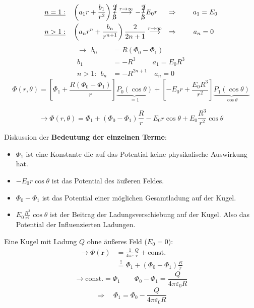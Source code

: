 \documentclass[titlepage,11pt,a4paper,ngerman]{report}
\newcommand{\tx}[1]{\textrm{#1}}
\newcommand{\const}{\tx{const.}}
\newcommand{\ub}[1]{\underbrace{#1}}
\newcommand{\pofr}{\Phi(\vec{r})}
\renewcommand{\Phi}{\varPhi}
\renewcommand{\vec}[1]{\boldsymbol{#1}}
\renewcommand{\epsilon}{\varepsilon}
\newcommand{\frbox}[2]{\begin{tcolorbox}[colback=white,colframe=red!75!black,fonttitle=\bfseries,title=#1]#2\end{tcolorbox}}
\begin{document}
\begin{enumerate}[i)]
\begin{align*}
	&\underline{n = 1:} \quad \left(a_1 r + \frac{b_1}{r^2}\right)\cancel{\frac{2}{3}} \buildrel r \to \infty \over \longrightarrow - \cancel{\frac{2}{3}} E_0 r \quad \ \Rightarrow \ \, \quad \ \  a_1 = E_0\\
	&\underline{n > 1:} \quad \left(a_n r^n + \frac{b_n}{r^{n+1}}\right) \frac{2}{2n+1} \buildrel r \to \infty \over \longrightarrow \quad \Rightarrow \qquad \: a_n = 0
	\end{align*}
	\begin{align*}
	\rightarrow \ \ b_0 &= R(\Phi_0 - \Phi_1)\\
	b_1 &= - R^3 \qquad \ \, a_1 = E_0 R^3\\
	n>1: \ \ b_n &= - R^{2n+1} \quad a_n = 0
	\end{align*}
	\begin{equation*}
	\Phi(r,\theta) = \left[\Phi_1 + \frac{R(\Phi_0 - \Phi_1)}{r}\right] \ub{P_0(\cos\theta)}_{=1} + \left[-E_0 r + \frac{E_0 R^3}{r^2}\right] \ub{P_1(\cos\theta)}_{\cos\theta}
	\end{equation*}
	\frbox{Potential einer Kugel im homogenen $ \vec{E} $-Feld}{\begin{equation*}
	\rightarrow\Phi(r,\theta) = \Phi_1 + (\Phi_0 - \Phi_1) \frac{R}{r} - E_0 r\cos\theta + E_0\frac{R^3}{r^2} \cos\theta
	\end{equation*}}
\end{enumerate}
Diskussion der \textbf{Bedeutung der einzelnen Terme}:
\begin{itemize}
	\item 	$ \Phi_1 $ ist eine Konstante die auf das Potential keine physikalische Auswirkung hat.
	\item $ -E_0 r \cos\theta $ ist das Potential des äußeren Feldes.
	\item $ \Phi_0 - \Phi_1 $ ist das Potential einer möglichen Gesamtladung auf der Kugel.
	\item $ E_0\frac{R^3}{r^2} \cos \theta $ ist der Beitrag der Ladungsverschiebung auf der Kugel. Also das Potential der Influenzierten Ladungen.
\end{itemize}
\begin{minipage}{.7\linewidth}
	Eine Kugel mit Ladung $ Q $ ohne äußeres Feld ($ E_0 = 0 $):
	\begin{align*}
	\rightarrow\pofr &= \frac{1}{4 \pi \epsilon} \frac{Q}{r} + \const\\
	&\overset{!}{=} \Phi_1 + (\Phi_0 - \Phi_1) \frac{R}{r}
	\end{align*}
	\begin{equation*}
	\rightarrow \const = \Phi_1 \qquad \Phi_0 - \Phi_1 = \frac{Q}{4 \pi \epsilon_0 R}
	\end{equation*}
	\begin{equation*}
	\Rightarrow \quad \Phi_1 = \Phi_0 - \frac{Q}{4 \pi \epsilon_0 R}
	\end{equation*}
	\vspace{5pt}
\end{minipage}
\end{document}

